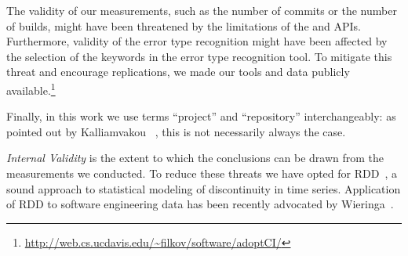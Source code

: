 The validity of our measurements, such as the number of commits or the 
number of builds, might have been threatened by the limitations of the \GH 
and \Tvis APIs.
Furthermore, validity of the error type recognition might have been affected 
by the selection of the keywords in the error type recognition tool. 
To mitigate this threat and encourage replications, we made our tools 
and data publicly available.\footnote{\url{http://web.cs.ucdavis.edu/~filkov/software/adoptCI/}}

Finally, in this work we use terms ``project'' and ``repository'' interchangeably: 
as pointed out by Kalliamvakou \etal~\cite{Kalliamvakou2014Promises}, this is 
not necessarily always the case. 


\smallskip \emph{Internal Validity} is the extent to which the conclusions can 
be drawn from the measurements we conducted. 
To reduce these threats we have opted for RDD~\cite{imbens2008regression}, 
a sound approach to statistical modeling of discontinuity in time series. 
Application of RDD to software engineering data has been recently advocated 
by Wieringa~\cite{Wieringa}.

 
